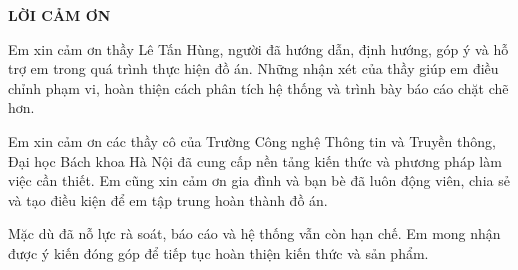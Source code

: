 \documentclass[../DoAn.tex]{subfiles}
\begin{document}
\begin{center}
    \Large{\textbf{LỜI CẢM ƠN}}\\
\end{center}
\vspace{1cm}

Em xin cảm ơn thầy Lê Tấn Hùng, người đã hướng dẫn, định hướng, góp ý và hỗ trợ em trong quá trình thực hiện đồ án. Những nhận xét của thầy giúp em điều chỉnh phạm vi, hoàn thiện cách phân tích hệ thống và trình bày báo cáo chặt chẽ hơn.

Em xin cảm ơn các thầy cô của Trường Công nghệ Thông tin và Truyền thông, Đại học Bách khoa Hà Nội đã cung cấp nền tảng kiến thức và phương pháp làm việc cần thiết. Em cũng xin cảm ơn gia đình và bạn bè đã luôn động viên, chia sẻ và tạo điều kiện để em tập trung hoàn thành đồ án.

Mặc dù đã nỗ lực rà soát, báo cáo và hệ thống vẫn còn hạn chế. Em mong nhận được ý kiến đóng góp để tiếp tục hoàn thiện kiến thức và sản phẩm.
\end{document}
